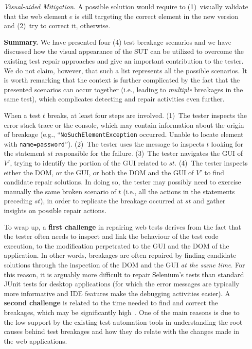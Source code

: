 \noindent
\textit{Visual-aided Mitigation.}
A possible solution would require to (1)~visually validate that the web element $e$ is still targeting the correct element in the new version and (2)~try to correct it, otherwise.

\noindent
\textbf{Summary.}
We have presented four (4) test breakage scenarios and we have discussed how the visual appearance of the SUT can be utilized to overcome the existing test repair approaches and give an important contribution to the tester. We do not claim, however, that such a list represents all the possible scenarios. It is worth remarking that the context is further complicated by the fact that the presented scenarios can occur together (i.e., leading to \textit{multiple} breakages in the same test), which complicates detecting and repair activities even further.

%
%
When a test $t$ breaks, at least four steps are involved. 
(1)~The tester inspects the error stack trace or the console, which may contain information about the origin of breakage (e.g., ``\texttt{NoSuchElementException} occurred. Unable to locate element with \mbox{\texttt{name=password}}''). 
(2)~The tester uses the message to inspects $t$ looking for the statement $st$ responsible for the failure. %
(3)~The tester navigates the GUI of $V'$, trying to identify the portion of the GUI related to $st$. 
(4)~The tester inspects either the DOM, or the GUI, or both the DOM and the GUI of $V'$ to find candidate repair solutions. In doing so, the tester may possibly need to exercise manually the same broken scenario of $t$ (i.e., all the actions in the statements preceding $st$), in order to replicate the breakage occurred at $st$ and gather insights on possible repair actions.

To wrap up, a \textbf{first challenge} in repairing web tests derives from the fact that  
the tester often needs to inspect and link the behaviour of the test code execution, to the modification perpetrated to the GUI and the DOM of the application. 
In other words, breakages are often repaired by finding candidate solutions through the inspection of the DOM and the GUI \textit{at the same time}.
For this reason, it is arguably more difficult to repair Selenium's tests than standard JUnit tests for desktop applications (for which the error messages are typically more informative and IDE features make the debugging activities easier).
%
A \textbf{second challenge} is related to the time needed to find and correct the breakages, which may be significantly high~\cite{Leotta-TAIC-2013,JAMAICA2013}. One of the main reasons is due to the low support by the existing test automation tools in understanding the root causes behind test breakages and how they do relate with the changes made in the web applications. 


